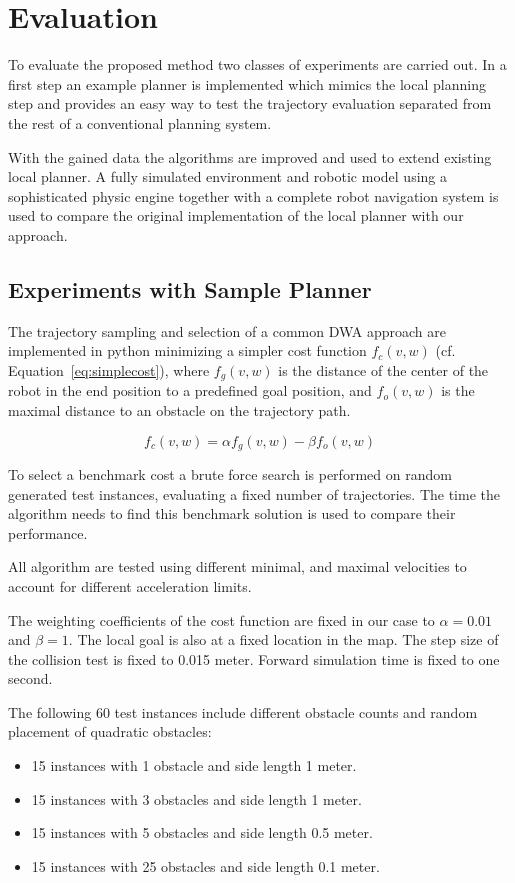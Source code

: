 \chapter{Evaluation}\label{ch:eval}
To evaluate the proposed method two classes of experiments are carried out. In a first step an example planner is implemented which mimics the local planning step and provides an easy way to test the trajectory evaluation separated from the rest of a conventional planning system.

With the gained data the algorithms are improved and used to extend existing local planner. A fully simulated environment and robotic model using a sophisticated physic engine together with a complete robot navigation system is used to compare the original implementation of the local planner with our approach.
 
\section{Experiments with Sample Planner}
The trajectory sampling and selection of a common DWA approach are implemented in python minimizing a simpler cost function $f_c(v,w)$ (cf. Equation~\ref{eq:simplecost}), where $f_g(v,w)$ is the distance of the center of the robot in the end position to a predefined goal position, and $f_o(v,w)$ is the maximal distance to an obstacle on the trajectory path.

\begin{equation}
   f_c(v,w)=\alpha f_g(v,w) - \beta f_o(v,w)
   \label{eq:simplecost}
\end{equation}

To select a benchmark cost a brute force search is performed on random generated test instances, evaluating a fixed number of trajectories. 
The time the algorithm needs to find this benchmark solution is used to compare their performance.

All algorithm are tested using different minimal, and maximal velocities to account for different acceleration limits. 

The weighting coefficients of the cost function are fixed in our case to $\alpha=0.01$ and $\beta=1$. The local goal is also at a fixed location in the map. 
The step size of the collision test is fixed to 0.015 meter. 
Forward simulation time is fixed to one second. 

The following 60 test instances include different obstacle counts and random placement of quadratic obstacles:
\begin{itemize}
\item 15 instances with 1 obstacle and side length 1 meter.
\item 15 instances with 3 obstacles and side length 1 meter.
\item 15 instances with 5 obstacles and side length 0.5 meter.
\item 15 instances with 25 obstacles and side length 0.1 meter.
\end{itemize}

